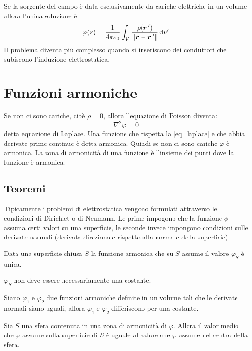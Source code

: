 Se la sorgente del campo è data esclusivamente da cariche elettriche in un volume allora l'unica soluzione è 
\begin{equation*}\varphi(\boldsymbol{r})=\frac{1}{4\pi\varepsilon_0}\int_V\frac{\rho(\boldsymbol{r}\,')}{\left\lVert\boldsymbol{r}-\boldsymbol{r}\,'\right\rVert}\,\mathrm{d} v'\end{equation*}
Il problema diventa più complesso quando si inseriscono dei conduttori che subiscono l'induzione elettrostatica.
\section{Funzioni armoniche}
Se non ci sono cariche, cioè $\rho=0$, allora l'equazione di Poisson diventa:
\begin{equation}
\nabla^2\varphi=0
\label{eq_laplace}
\end{equation}
detta equazione di Laplace. Una funzione che rispetta la \eqref{eq_laplace} e che abbia derivate prime continue è detta armonica. Quindi se non ci sono cariche $\varphi$ è armonica. La zona di armonicità di una funzione è l'insieme dei punti dove la funzione è armonica.
\subsection{Teoremi}
Tipicamente i problemi di elettrostatica vengono formulati attraverso le condizioni di Dirichlet o di Neumann. Le prime impogono che la funzione $\phi$ assuma certi valori su una superficie, le seconde invece impongono condizioni sulle derivate normali (derivata direzionale rispetto alla normale della superficie).
\begin{Teo}
Data una superficie chiusa $S$ la funzione armonica che su $S$ assume il valore $\varphi_S$ è unica.
\end{Teo}
$\varphi_S$ non deve essere necessariamente una costante.
\begin{Teo}
Siano $\varphi_1$ e $\varphi_2$ due funzioni armoniche definite in un volume tali che le derivate normali siano uguali, allora $\varphi_1$ e $\varphi_2$ differiscono per una costante.
\end{Teo}
\begin{Teo}[media]
Sia $S$ una sfera contenuta in una zona di armonicità di $\varphi$. Allora il valor medio che $\varphi$ assume sulla superficie di $S$ è uguale al valore che $\varphi$ assume nel centro della sfera.
\end{Teo}
